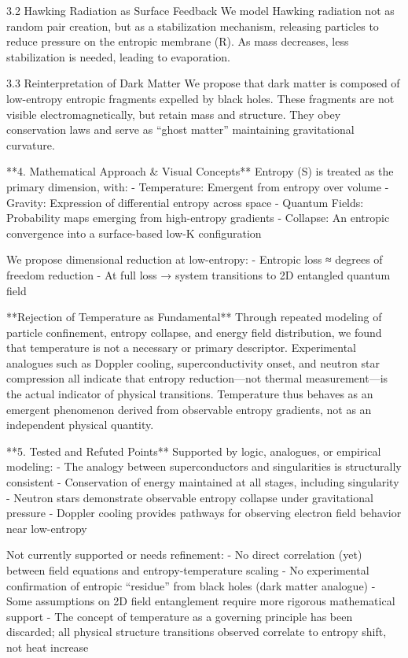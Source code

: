 3.2 Hawking Radiation as Surface Feedback
We model Hawking radiation not as random pair creation, but as a stabilization mechanism, releasing particles to reduce pressure on the entropic membrane (R). As mass decreases, less stabilization is needed, leading to evaporation.

3.3 Reinterpretation of Dark Matter
We propose that dark matter is composed of low-entropy entropic fragments expelled by black holes. These fragments are not visible electromagnetically, but retain mass and structure. They obey conservation laws and serve as “ghost matter” maintaining gravitational curvature.

**4. Mathematical Approach & Visual Concepts**
Entropy (S) is treated as the primary dimension, with:
- Temperature: Emergent from entropy over volume
- Gravity: Expression of differential entropy across space
- Quantum Fields: Probability maps emerging from high-entropy gradients
- Collapse: An entropic convergence into a surface-based low-K configuration

We propose dimensional reduction at low-entropy:
- Entropic loss ≈ degrees of freedom reduction
- At full loss → system transitions to 2D entangled quantum field

**Rejection of Temperature as Fundamental**
Through repeated modeling of particle confinement, entropy collapse, and energy field distribution, we found that temperature is not a necessary or primary descriptor. Experimental analogues such as Doppler cooling, superconductivity onset, and neutron star compression all indicate that entropy reduction—not thermal measurement—is the actual indicator of physical transitions. Temperature thus behaves as an emergent phenomenon derived from observable entropy gradients, not as an independent physical quantity.

**5. Tested and Refuted Points**
Supported by logic, analogues, or empirical modeling:
- The analogy between superconductors and singularities is structurally consistent
- Conservation of energy maintained at all stages, including singularity
- Neutron stars demonstrate observable entropy collapse under gravitational pressure
- Doppler cooling provides pathways for observing electron field behavior near low-entropy

Not currently supported or needs refinement:
- No direct correlation (yet) between field equations and entropy-temperature scaling
- No experimental confirmation of entropic “residue” from black holes (dark matter analogue)
- Some assumptions on 2D field entanglement require more rigorous mathematical support
- The concept of temperature as a governing principle has been discarded; all physical structure transitions observed correlate to entropy shift, not heat increase

